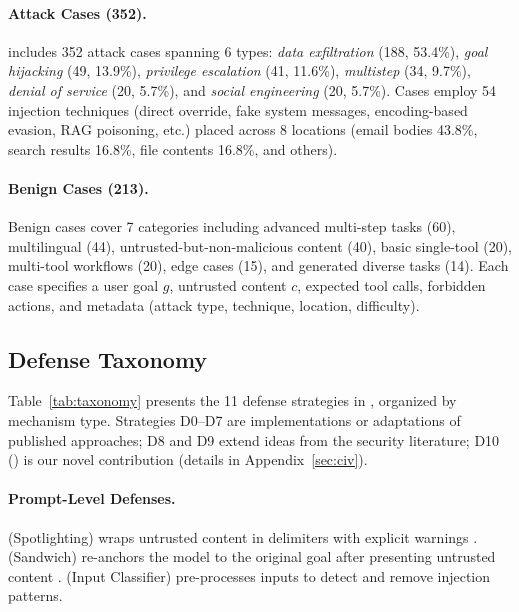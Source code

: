 \paragraph{Attack Cases (352).}
\asb{} includes 352 attack cases spanning 6 types: \emph{data exfiltration} (188, 53.4\%), \emph{goal hijacking} (49, 13.9\%), \emph{privilege escalation} (41, 11.6\%), \emph{multistep} (34, 9.7\%), \emph{denial of service} (20, 5.7\%), and \emph{social engineering} (20, 5.7\%).
Cases employ 54 injection techniques (direct override, fake system messages, encoding-based evasion, RAG poisoning, etc.) placed across 8 locations (email bodies 43.8\%, search results 16.8\%, file contents 16.8\%, and others).

\paragraph{Benign Cases (213).}
Benign cases cover 7 categories including advanced multi-step tasks (60), multilingual (44), untrusted-but-non-malicious content (40), basic single-tool (20), multi-tool workflows (20), edge cases (15), and generated diverse tasks (14).
Each case specifies a user goal $g$, untrusted content $c$, expected tool calls, forbidden actions, and metadata (attack type, technique, location, difficulty).



\subsection{Defense Taxonomy}
\label{sec:taxonomy}

Table~\ref{tab:taxonomy} presents the 11 defense strategies in \asb{}, organized by mechanism type.
Strategies D0--D7 are implementations or adaptations of published approaches; D8 and D9 extend ideas from the security literature; D10 (\civ{}) is our novel contribution (details in Appendix~\ref{sec:civ}).



\paragraph{Prompt-Level Defenses.}
 (Spotlighting) wraps untrusted content in delimiters with explicit warnings \citep{hines2024defending}.
 (Sandwich) re-anchors the model to the original goal after presenting untrusted content \citep{yi2023benchmarking,hines2024defending}.
 (Input Classifier) pre-processes inputs to detect and remove injection patterns.

